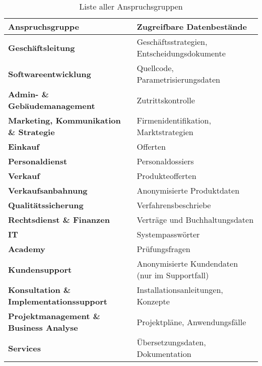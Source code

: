 \documentclass[../../main.tex]{subfiles}
\begin{document}

\begin{table}[H]
\tablefontsize
\centering
\caption{Liste aller Anspruchsgruppen}
\label{potentielle_anspruchsgruppen}


\begin{tabular}{ |l|l| }


\hline
\tableheaderbgcolor
\textbf{Anspruchsgruppe} & \textbf{Zugreifbare Datenbestände}\\ 
\hline


\textbf{Geschäftsleitung} & Geschäftsstrategien, Entscheidungsdokumente         \\ \hline
\textbf{Softwareentwicklung} & Quellcode, Parametrisierungsdaten                \\ \hline
\textbf{Admin- \& Gebäudemanagement} & Zutrittskontrolle                        \\ \hline
\textbf{Marketing, Kommunikation \& Strategie} & Firmenidentifikation, Marktstrategien\\ \hline
\textbf{Einkauf} & Offerten                                                     \\ \hline
\textbf{Personaldienst} & Personaldossiers                                      \\ \hline
\textbf{Verkauf} & Produkteofferten                                             \\ \hline
\textbf{Verkaufsanbahnung} & Anonymisierte Produktdaten                         \\ \hline
\textbf{Qualitätssicherung} & Verfahrensbeschriebe                              \\ \hline
\textbf{Rechtsdienst \& Finanzen} & Verträge und Buchhaltungsdaten              \\ \hline
\textbf{IT} &  Systempasswörter                               \\ \hline
\textbf{Academy} & Prüfungsfragen                                               \\ \hline
\textbf{Kundensupport} & Anonymisierte Kundendaten (nur im Supportfall)         \\ \hline
\textbf{Konsultation \& Implementationssupport} & Installationsanleitungen, Konzepte       \\ \hline
\textbf{Projektmanagement \& Business Analyse} & Projektpläne,  Anwendungsfälle \\ \hline
\textbf{Services} & Übersetzungsdaten, Dokumentation \\ \hline

\end{tabular}
\end{table}
\end{document}

